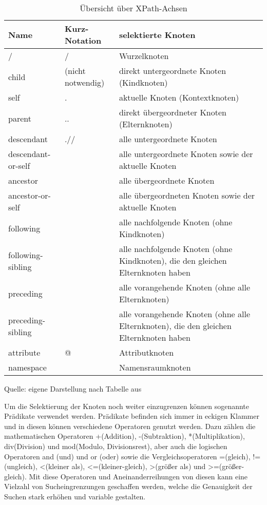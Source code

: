 \begin{table}[h!]
    \centering
    \begin{tabular}{|l|l|p{8cm}|} %
        \hline
        \textbf{Name} & \textbf{Kurz-Notation} & \textbf{selektierte Knoten} \\
        \hline
        / & / & Wurzelknoten \\
        \hline
        child & (nicht notwendig) & direkt untergeordnete Knoten (Kindknoten) \\
        \hline
        self & . & aktuelle Knoten (Kontextknoten) \\
        \hline
        parent & .. & direkt übergeordneter Knoten (Elternknoten) \\
        \hline
        descendant & .// & alle untergeordnete Knoten \\
        \hline
        descendant-or-self &  & alle untergeordnete Knoten sowie der aktuelle Knoten \\
        \hline
        ancestor &  & alle übergeordnete Knoten \\
        \hline
        ancestor-or-self &  & alle übergeordneten Knoten sowie der aktuelle Knoten \\
        \hline
        following &  & alle nachfolgende Knoten (ohne Kindknoten) \\
        \hline
        following-sibling &  & alle nachfolgende Knoten (ohne Kindknoten), die den gleichen Elternknoten haben \\
        \hline
        preceding &  & alle vorangehende Knoten (ohne alle Elternknoten) \\
        \hline
        preceding-sibling &  & alle vorangehende Knoten (ohne alle Elternknoten), die den gleichen Elternknoten haben \\
        \hline
        attribute & @ & Attributknoten \\
        \hline
        namespace &  & Namensraumknoten \\
        \hline
    \end{tabular}
    \caption{Übersicht über XPath-Achsen}
    \label{tab:Übersicht über XPath-Achsen}
    \vspace{0.2cm}
    {\small Quelle: eigene Darstellung nach Tabelle aus \cite*{XPath2025}}
\end{table}

Um die Selektierung der Knoten noch weiter einzugrenzen können sogenannte Prädikate verwendet werden.
Prädikate befinden sich immer in eckigen Klammer und in diesen können verschiedene Operatoren genutzt werden.
Dazu zählen die mathematischen Operatoren +(Addition), -(Subtraktion), *(Multiplikation), div(Division) und mod(Modulo, Divisionsrest),
aber auch die logischen Operatoren and (und) und or (oder) sowie die Vergleichsoperatoren =(gleich), !=(ungleich),
<(kleiner als), <=(kleiner-gleich), >(größer als) und >=(größer-gleich).
Mit diese Operatoren und Aneinanderreihungen von diesen kann eine Vielzahl von Sucheingrenzungen geschaffen werden,
welche die Genauigkeit der Suchen stark erhöhen und variable gestalten.

